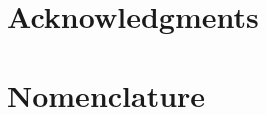 \maketitle

\chapter*{Acknowledgments}


\begin{spacing}{0.99}
\tableofcontents
\end{spacing}

\chapter*{Nomenclature}

